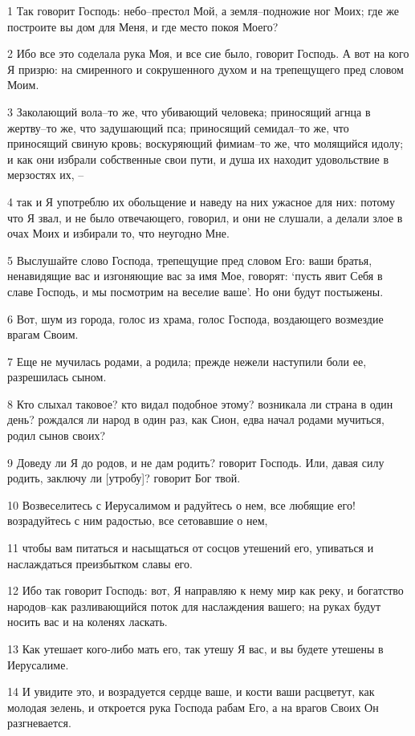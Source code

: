\par 1 Так говорит Господь: небо--престол Мой, а земля--подножие ног Моих; где же построите вы дом для Меня, и где место покоя Моего?
\par 2 Ибо все это соделала рука Моя, и все сие было, говорит Господь. А вот на кого Я призрю: на смиренного и сокрушенного духом и на трепещущего пред словом Моим.
\par 3 Заколающий вола--то же, что убивающий человека; приносящий агнца в жертву--то же, что задушающий пса; приносящий семидал--то же, что приносящий свиную кровь; воскуряющий фимиам--то же, что молящийся идолу; и как они избрали собственные свои пути, и душа их находит удовольствие в мерзостях их, --
\par 4 так и Я употреблю их обольщение и наведу на них ужасное для них: потому что Я звал, и не было отвечающего, говорил, и они не слушали, а делали злое в очах Моих и избирали то, что неугодно Мне.
\par 5 Выслушайте слово Господа, трепещущие пред словом Его: ваши братья, ненавидящие вас и изгоняющие вас за имя Мое, говорят: `пусть явит Себя в славе Господь, и мы посмотрим на веселие ваше'. Но они будут постыжены.
\par 6 Вот, шум из города, голос из храма, голос Господа, воздающего возмездие врагам Своим.
\par 7 Еще не мучилась родами, а родила; прежде нежели наступили боли ее, разрешилась сыном.
\par 8 Кто слыхал таковое? кто видал подобное этому? возникала ли страна в один день? рождался ли народ в один раз, как Сион, едва начал родами мучиться, родил сынов своих?
\par 9 Доведу ли Я до родов, и не дам родить? говорит Господь. Или, давая силу родить, заключу ли [утробу]? говорит Бог твой.
\par 10 Возвеселитесь с Иерусалимом и радуйтесь о нем, все любящие его! возрадуйтесь с ним радостью, все сетовавшие о нем,
\par 11 чтобы вам питаться и насыщаться от сосцов утешений его, упиваться и наслаждаться преизбытком славы его.
\par 12 Ибо так говорит Господь: вот, Я направляю к нему мир как реку, и богатство народов--как разливающийся поток для наслаждения вашего; на руках будут носить вас и на коленях ласкать.
\par 13 Как утешает кого-либо мать его, так утешу Я вас, и вы будете утешены в Иерусалиме.
\par 14 И увидите это, и возрадуется сердце ваше, и кости ваши расцветут, как молодая зелень, и откроется рука Господа рабам Его, а на врагов Своих Он разгневается.
